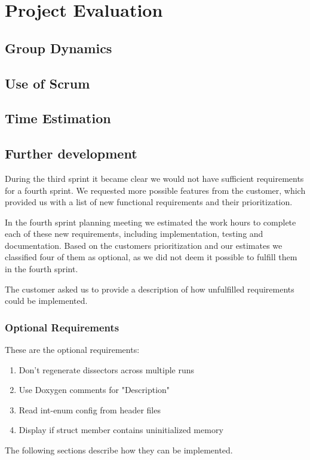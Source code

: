 \chapter{Project Evaluation}

\section{Group Dynamics}

\section{Use of Scrum}

\section{Time Estimation}


\section{Further development}
\label{sec:eval:furtherdev}
During the third sprint it became clear we would not have sufficient requirements for a fourth sprint. We requested more possible features from the customer, which provided us with a list of new functional requirements and their prioritization.

In the fourth sprint planning meeting we estimated the work hours to complete each of these new requirements, including implementation, testing and documentation. Based on the customers prioritization and our estimates we classified four of them as optional, as we did not deem it possible to fulfill them in the fourth sprint. 

The customer asked us to provide a description of how unfulfilled requirements could be implemented.

\subsection{Optional Requirements}
These are the optional requirements:
\begin{enumerate}
\item Don't regenerate dissectors across multiple runs
\item Use Doxygen comments for "Description"	
\item Read int-enum config from header files
\item Display if struct member contains uninitialized memory
\end {enumerate}
The following sections describe how they can be implemented.


